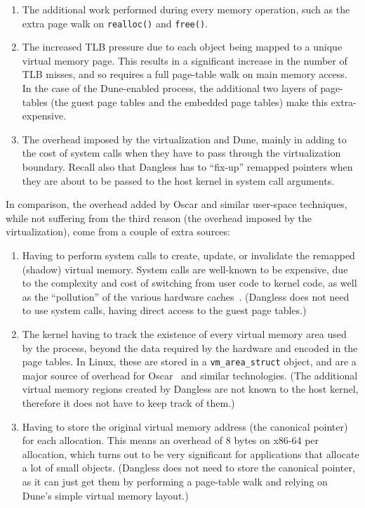 \begin{enumerate}
	\item The additional work performed during every memory operation, such as the extra page walk on \lstinline!realloc()! and \lstinline!free()!.
	\item The increased TLB pressure due to each object being mapped to a unique virtual memory page. This results in a significant increase in the number of TLB misses, and so requires a full page-table walk on main memory access. In the case of the Dune-enabled process, the additional two layers of page-tables (the guest page tables and the embedded page tables) make this extra-expensive.
	\item The overhead imposed by the virtualization and Dune, mainly in adding to the cost of system calls when they have to pass through the virtualization boundary. Recall also that Dangless has to ``fix-up'' remapped pointers when they are about to be passed to the host kernel in system call arguments.
\end{enumerate}

In comparison, the overhead added by Oscar and similar user-space techniques, while not suffering from the third reason (the overhead imposed by the virtualization), come from a couple of extra sources:

\begin{enumerate}
	\item Having to perform system calls to create, update, or invalidate the remapped (shadow) virtual memory. System calls are well-known to be expensive, due to the complexity and cost of switching from user code to kernel code, as well as the ``pollution'' of the various hardware caches~\cite{flexsc2010-syscalls}. (Dangless does not need to use system calls, having direct access to the guest page tables.)
	\item The kernel having to track the existence of every virtual memory area used by the process, beyond the data required by the hardware and encoded in the page tables. In Linux, these are stored in a \lstinline!vm_area_struct! object, and are a major source of overhead for Oscar~\cite{oscar2017} and similar technologies. (The additional virtual memory regions created by Dangless are not known to the host kernel, therefore it does not have to keep track of them.)
	\item Having to store the original virtual memory address (the canonical pointer) for each allocation. This means an overhead of 8 bytes on x86-64 per allocation, which turns out to be very significant for applications that allocate a lot of small objects. (Dangless does not need to store the canonical pointer, as it can just get them by performing a page-table walk and relying on Dune's simple virtual memory layout.)
\end{enumerate}

